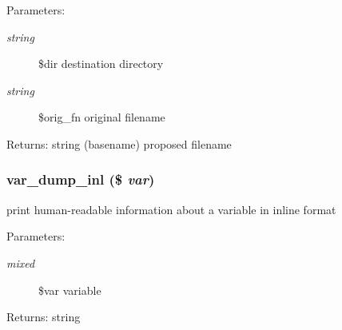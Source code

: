 \begin{Desc}
\item[Parameters:]
\begin{description}
\item[{\em string}]\$dir destination directory \item[{\em string}]\$orig\_\-fn original filename \end{description}
\end{Desc}
\begin{Desc}
\item[Returns:]string (basename) proposed filename \end{Desc}
\hypertarget{util_8inc_8php_a5cc9d5f8a0b5bb76dfe3d15796e5940}{
\subsubsection[{var\_\-dump\_\-inl}]{\setlength{\rightskip}{0pt plus 5cm}var\_\-dump\_\-inl (\$ {\em var})}}
\label{util_8inc_8php_a5cc9d5f8a0b5bb76dfe3d15796e5940}


print human-readable information about a variable in inline format

\begin{Desc}
\item[Parameters:]
\begin{description}
\item[{\em mixed}]\$var variable \end{description}
\end{Desc}
\begin{Desc}
\item[Returns:]string \end{Desc}

